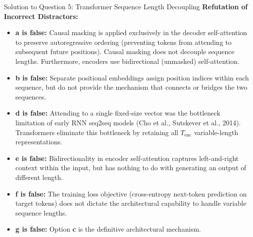 \documentclass[11pt,a4paper]{article}
\begin{document}
\begin{solutionbox}{Solution to Question 5: Transformer Sequence Length Decoupling}
\medskip
\noindent
\textbf{Refutation of Incorrect Distractors:}
\begin{itemize}[leftmargin=1.5em]
    \item \textbf{a is false:} Causal masking is applied exclusively in the decoder self-attention to preserve autoregressive ordering (preventing tokens from attending to subsequent future positions). Causal masking does not decouple sequence lengths. Furthermore, encoders use bidirectional (unmasked) self-attention.
    \item \textbf{b is false:} Separate positional embeddings assign position indices within each sequence, but do not provide the mechanism that connects or bridges the two sequences.
    \item \textbf{d is false:} Attending to a single fixed-size vector was the bottleneck limitation of early RNN seq2seq models (Cho et al., Sutskever et al., 2014). Transformers eliminate this bottleneck by retaining all $T_{\text{enc}}$ variable-length representations.
    \item \textbf{e is false:} Bidirectionality in encoder self-attention captures left-and-right context within the input, but has nothing to do with generating an output of different length.
    \item \textbf{f is false:} The training loss objective (cross-entropy next-token prediction on target tokens) does not dictate the architectural capability to handle variable sequence lengths.
    \item \textbf{g is false:} Option \textbf{c} is the definitive architectural mechanism.
\end{itemize}
\end{solutionbox}

\vspace{1.5em}
\end{document}
